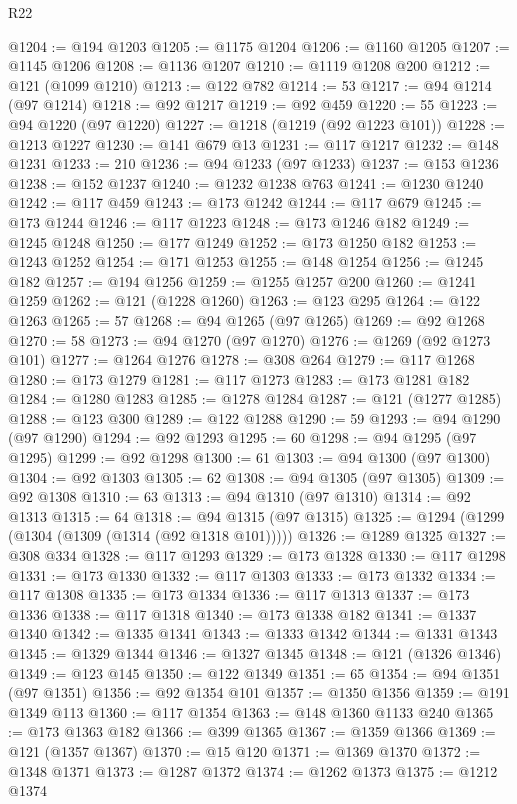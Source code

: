 \begin{lexlean}{R22}
\begin{coremodule}
@1204 := @194 @1203
@1205 := @1175 @1204
@1206 := @1160 @1205
@1207 := @1145 @1206
@1208 := @1136 @1207
@1210 := @1119 @1208 @200
@1212 := @121 (@1099 @1210)
@1213 := @122 @782
@1214 := 53
@1217 := @94 @1214 (@97 @1214)
@1218 := @92 @1217
@1219 := @92 @459
@1220 := 55
@1223 := @94 @1220 (@97 @1220)
@1227 := @1218 (@1219 (@92 @1223 @101))
@1228 := @1213 @1227
@1230 := @141 @679 @13
@1231 := @117 @1217
@1232 := @148 @1231
@1233 := 210
@1236 := @94 @1233 (@97 @1233)
@1237 := @153 @1236
@1238 := @152 @1237
@1240 := @1232 @1238 @763
@1241 := @1230 @1240
@1242 := @117 @459
@1243 := @173 @1242
@1244 := @117 @679
@1245 := @173 @1244
@1246 := @117 @1223
@1248 := @173 @1246 @182
@1249 := @1245 @1248
@1250 := @177 @1249
@1252 := @173 @1250 @182
@1253 := @1243 @1252
@1254 := @171 @1253
@1255 := @148 @1254
@1256 := @1245 @182
@1257 := @194 @1256
@1259 := @1255 @1257 @200
@1260 := @1241 @1259
@1262 := @121 (@1228 @1260)
@1263 := @123 @295
@1264 := @122 @1263
@1265 := 57
@1268 := @94 @1265 (@97 @1265)
@1269 := @92 @1268
@1270 := 58
@1273 := @94 @1270 (@97 @1270)
@1276 := @1269 (@92 @1273 @101)
@1277 := @1264 @1276
@1278 := @308 @264
@1279 := @117 @1268
@1280 := @173 @1279
@1281 := @117 @1273
@1283 := @173 @1281 @182
@1284 := @1280 @1283
@1285 := @1278 @1284
@1287 := @121 (@1277 @1285)
@1288 := @123 @300
@1289 := @122 @1288
@1290 := 59
@1293 := @94 @1290 (@97 @1290)
@1294 := @92 @1293
@1295 := 60
@1298 := @94 @1295 (@97 @1295)
@1299 := @92 @1298
@1300 := 61
@1303 := @94 @1300 (@97 @1300)
@1304 := @92 @1303
@1305 := 62
@1308 := @94 @1305 (@97 @1305)
@1309 := @92 @1308
@1310 := 63
@1313 := @94 @1310 (@97 @1310)
@1314 := @92 @1313
@1315 := 64
@1318 := @94 @1315 (@97 @1315)
@1325 := @1294 (@1299 (@1304 (@1309 (@1314 (@92 @1318 @101)))))
@1326 := @1289 @1325
@1327 := @308 @334
@1328 := @117 @1293
@1329 := @173 @1328
@1330 := @117 @1298
@1331 := @173 @1330
@1332 := @117 @1303
@1333 := @173 @1332
@1334 := @117 @1308
@1335 := @173 @1334
@1336 := @117 @1313
@1337 := @173 @1336
@1338 := @117 @1318
@1340 := @173 @1338 @182
@1341 := @1337 @1340
@1342 := @1335 @1341
@1343 := @1333 @1342
@1344 := @1331 @1343
@1345 := @1329 @1344
@1346 := @1327 @1345
@1348 := @121 (@1326 @1346)
@1349 := @123 @145
@1350 := @122 @1349
@1351 := 65
@1354 := @94 @1351 (@97 @1351)
@1356 := @92 @1354 @101
@1357 := @1350 @1356
@1359 := @191 @1349 @113
@1360 := @117 @1354
@1363 := @148 @1360 @1133 @240
@1365 := @173 @1363 @182
@1366 := @399 @1365
@1367 := @1359 @1366
@1369 := @121 (@1357 @1367)
@1370 := @15 @120
@1371 := @1369 @1370
@1372 := @1348 @1371
@1373 := @1287 @1372
@1374 := @1262 @1373
@1375 := @1212 @1374

\end{coremodule}
\end{lexlean}
